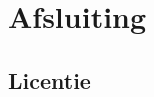 \documentclass[
    dutch,
    everyoneauthor=true,
    darktheme,
    defaultSlideCollection=vincent,
    handout
]{../../cursuspresentatie}
\begin{document}
\section{Afsluiting}




% 

% 

% 

% 

% 


% 

\subsection{Licentie}
    
\end{document}
